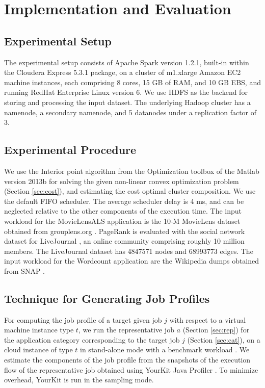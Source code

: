 \documentclass[conference]{IEEEtran}
\begin{document}
%
 
\section{Implementation and Evaluation}\label{sec:evaluation}


\subsection{Experimental Setup}\label{sec:setup}
 The experimental setup consists of Apache Spark version 1.2.1, built-in within the Cloudera Express 5.3.1 package, on a
  cluster of m1.xlarge Amazon EC2 machine instances, each comprising 8 cores, 15 GB of RAM, and 10 GB EBS, and
  running RedHat Enterprise Linux version 6.
   We use HDFS as the backend for storing and processing the input dataset. The underlying Hadoop cluster has a namenode, a secondary namenode, and
5 datanodes under a replication factor of 3. \subsection{Experimental Procedure}\label{sec:procedure}
We use the Interior point algorithm \cite{leader2004numerical} from the Optimization toolbox of the Matlab version 2013b for solving the given non-linear convex optimization problem (Section \ref{sec:cost}), and estimating the cost optimal cluster composition. We use the default FIFO scheduler. The average scheduler delay is
 4 ms, and can be neglected relative to the other components of the execution time.
     The input workload for
the MovieLensALS application is the 10-M MovieLens dataset obtained from grouplens.org \cite{MOVIELENS-DATA}.
 PageRank is evaluated with the social network dataset for LiveJournal \cite{snapnets}, an online community comprising roughly 10 million members. The LiveJournal dataset has 4847571 nodes and 68993773 edges. The input workload for the Wordcount application are the Wikipedia dumps obtained from SNAP \cite{snapnets}.


\subsection{Technique for Generating Job Profiles}\label{sec:tech}
For computing the job profile of a target given
 job $j$ with respect to a virtual machine instance type $t$, we run the representative job $a$ (Section \ref{sec:rep}) for the
 application category corresponding to the target job $j$ (Section \ref{sec:cat}), on a cloud instance of type $t$ in stand-alone mode with a benchmark workload \cite{Pavlo:2009:CAL:1559845.1559865}. We estimate the components of the job profile from the snapshots of the execution flow of the representative
   job obtained using YourKit Java Profiler \cite{YKfJ07}. To minimize overhead, YourKit is run in the sampling mode. 
\end{document}
